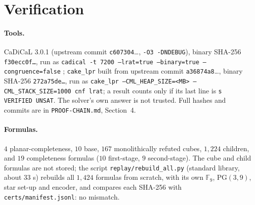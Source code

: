 \documentclass[11pt]{article}
\theoremstyle{plain}
\theoremstyle{remark}
\newcommand{\PG}{\mathrm{PG}}
\newcommand{\F}{\mathbb F}
\newcommand{\file}[1]{\texttt{#1}}
\begin{document}
\section{Verification}

\paragraph{Tools.}
CaDiCaL 3.0.1 (upstream commit \texttt{c607304}\dots, \texttt{-O3 -DNDEBUG}), binary SHA-256 \texttt{f30ecc0f\dots}, run as \texttt{cadical -t 7200 --lrat=true --binary=true --congruence=false} \cite{BFFF};
\texttt{cake\_lpr} \cite{TanHM} built from upstream commit \texttt{a36874a8}\dots, binary SHA-256 \texttt{272a75de\dots}, run as \texttt{cake\_lpr --CML\_HEAP\_SIZE=<MB> --CML\_STACK\_SIZE=1000 cnf lrat}; a result counts only if its last line is \texttt{s VERIFIED UNSAT}.
The solver's own answer is not trusted.
Full hashes and commits are in \file{PROOF-CHAIN.md}, Section~4.

\paragraph{Formulas.}
$4$ planar-completeness, $10$ base, $167$ monolithically refuted cubes, $1{,}224$ children, and $19$ completeness formulas ($10$ first-stage, $9$ second-stage).
The cube and child formulas are not stored; the script \file{replay/rebuild\_all.py} (standard library, about $33$ s) rebuilds all $1{,}424$ formulas from scratch, with its own $\F_9$, $\PG(3,9)$, star set-up and encoder, and compares each SHA-256 with \file{certs/manifest.jsonl}: no mismatch.
\end{document}

